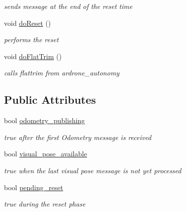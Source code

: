 \begin{DoxyCompactItemize}
\begin{DoxyCompactList}\small\item\em sends message at the end of the reset time \end{DoxyCompactList}\item 
\mbox{\label{classPoseEstimator_acd454e1cf1760ee87afda4b2b3051588}} 
void \hyperlink{classPoseEstimator_acd454e1cf1760ee87afda4b2b3051588}{do\+Reset} ()
\begin{DoxyCompactList}\small\item\em performs the reset \end{DoxyCompactList}\item 
\mbox{\label{classPoseEstimator_a3816f761030c23edda909f8ada8ae013}} 
void \hyperlink{classPoseEstimator_a3816f761030c23edda909f8ada8ae013}{do\+Flat\+Trim} ()
\begin{DoxyCompactList}\small\item\em calls flattrim from ardrone\+\_\+autonomy \end{DoxyCompactList}\end{DoxyCompactItemize}
\subsection*{Public Attributes}
\begin{DoxyCompactItemize}
\item 
\mbox{\label{classPoseEstimator_a0bc724bd1916a0368cad55d93882a525}} 
bool \hyperlink{classPoseEstimator_a0bc724bd1916a0368cad55d93882a525}{odometry\+\_\+publishing}
\begin{DoxyCompactList}\small\item\em true after the first Odometry message is received \end{DoxyCompactList}\item 
\mbox{\label{classPoseEstimator_a114807c229a2dad46c0d8546e06d8271}} 
bool \hyperlink{classPoseEstimator_a114807c229a2dad46c0d8546e06d8271}{visual\+\_\+pose\+\_\+available}
\begin{DoxyCompactList}\small\item\em true when the last visual pose message is not yet processed \end{DoxyCompactList}\item 
\mbox{\label{classPoseEstimator_a7dc4da9163baf3c6809ae45ab4a7ff37}} 
bool \hyperlink{classPoseEstimator_a7dc4da9163baf3c6809ae45ab4a7ff37}{pending\+\_\+reset}
\begin{DoxyCompactList}\small\item\em true during the reset phase \end{DoxyCompactList}\end{DoxyCompactItemize}
